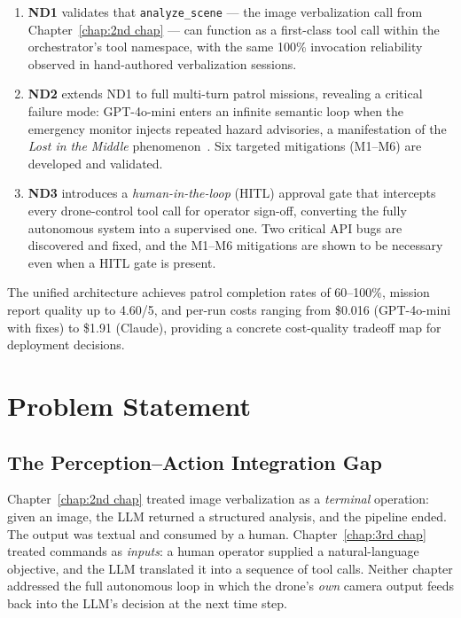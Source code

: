 \begin{enumerate}
  \item \textbf{ND1} validates that \texttt{analyze\_scene} --- the image verbalization call
    from Chapter~\ref{chap:2nd chap} --- can function as a first-class tool call within the
    orchestrator's tool namespace, with the same 100\% invocation reliability observed in
    hand-authored verbalization sessions.

  \item \textbf{ND2} extends ND1 to full multi-turn patrol missions, revealing a critical
    failure mode: GPT-4o-mini enters an infinite semantic loop when the emergency monitor
    injects repeated hazard advisories, a manifestation of the \emph{Lost in the Middle}
    phenomenon~\cite{liu2023lostinthemiddle}.  Six targeted mitigations (M1--M6) are
    developed and validated.

  \item \textbf{ND3} introduces a \emph{human-in-the-loop} (HITL) approval gate that
    intercepts every drone-control tool call for operator sign-off, converting the fully
    autonomous system into a supervised one.  Two critical API bugs are discovered and fixed,
    and the M1--M6 mitigations are shown to be necessary even when a HITL gate is present.
\end{enumerate}

The unified architecture achieves patrol completion rates of 60--100\%, mission report
quality up to 4.60/5, and per-run costs ranging from \$0.016 (GPT-4o-mini with fixes) to
\$1.91 (Claude), providing a concrete cost-quality tradeoff map for deployment decisions.

\section{Problem Statement}
\label{sec:ch4_problem}

\subsection{The Perception--Action Integration Gap}
\label{sec:ch4_problem_gap}

Chapter~\ref{chap:2nd chap} treated image verbalization as a \emph{terminal} operation:
given an image, the LLM returned a structured analysis, and the pipeline ended.  The output
was textual and consumed by a human.  Chapter~\ref{chap:3rd chap} treated commands as
\emph{inputs}: a human operator supplied a natural-language objective, and the LLM translated
it into a sequence of tool calls.  Neither chapter addressed the full autonomous loop in
which the drone's \emph{own} camera output feeds back into the LLM's decision at the next
time step.


